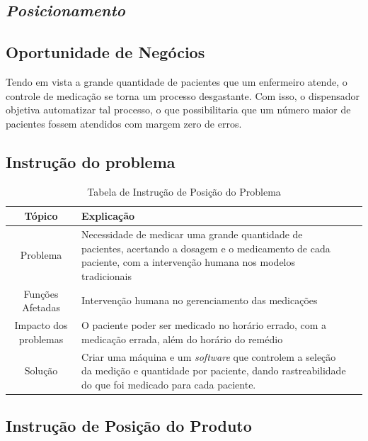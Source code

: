 \begin{apendicesenv}
\section{\textit{Posicionamento}}
\subsection*{Oportunidade de Negócios}

Tendo em vista a grande quantidade de pacientes que um enfermeiro atende, o controle de medicação se torna um processo desgastante. Com isso, o dispensador objetiva automatizar tal processo, o que possibilitaria que um número maior de pacientes fossem atendidos com margem zero de erros.

\subsection*{Instrução do problema}

\begin{table}[H]
    \centering
    \caption{Tabela de Instrução de Posição do Problema}
    \begin{tabularx}{\textwidth}{|c|X|c|}
        \hline
        \rowcolor[HTML]{A8DADC}
        \textbf{Tópico} & \textbf{Explicação} \\ \hline
        
        Problema & Necessidade de medicar uma grande quantidade de pacientes, acertando a dosagem e o medicamento de cada paciente, com a intervenção humana nos modelos tradicionais \\\hline
        
        Funções Afetadas & Intervenção humana no gerenciamento das medicações \\ \hline
        
        Impacto dos problemas & O paciente poder ser medicado no horário errado, com a medicação errada, além do horário do remédio\\ \hline
        
        Solução & Criar uma máquina e um \textit{software} que controlem a seleção da medição e quantidade por paciente, dando rastreabilidade do que foi medicado para cada paciente.\\ \hline
    \end{tabularx}
\end{table}

\subsection*{Instrução de Posição do Produto}


\end{apendicesenv}
